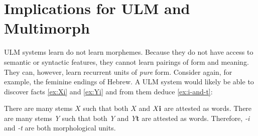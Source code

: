 


\section{Implications for \ac{ULM}  and Multimorph}

\ac{ULM}  systems learn do not learn morphemes. Because they do not have access to
semantic or syntactic features, they cannot learn pairings of form and meaning. 
They can, however, learn recurrent units of \emph{pure} form. Consider again, 
for example, the feminine endings of Hebrew. A \ac{ULM}  system would likely be 
able to discover facts \ref{ex:Xi} and \ref{ex:Yi} and from them deduce 
\ref{ex:i-and-t}: %
\begin{exe} \label{ex:observations1}
\ex There are many stems $X$ such that both $X$ and $X\text{\textbf{i}}$ are 
attested as words. \label{ex:Xi}
 \ex There are many stems \textit{Y} such that both \textit{Y} and \textit{Y}\textbf{t} 
 are attested as words. \label{ex:Yi}
\ex Therefore, \textit{-i} and \textit{-t} are both morphological units. \label{ex:i-and-t}
\end{exe}

